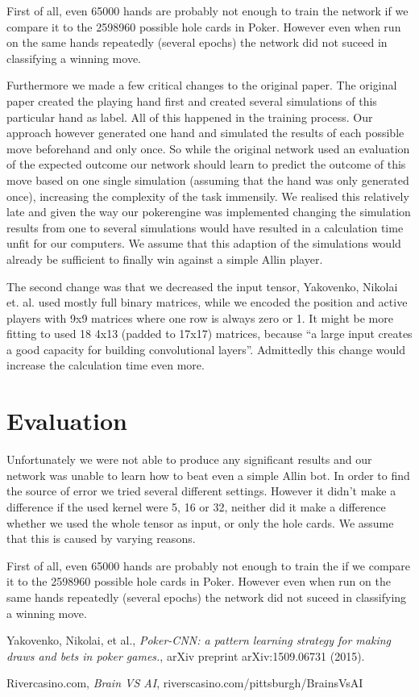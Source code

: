 \documentclass[]{report}
\begin{document}
First of all, even 65000 hands are probably not enough to train the
network if we compare it to the 2598960 possible hole cards in Poker.
However even when run on the same hands repeatedly (several epochs)
the network did not suceed in classifying a winning move. 

Furthermore we made a few critical changes to the original paper.
The original paper created the playing hand first and created several
simulations of this particular hand as label. All of this happened
in the training process. Our approach however generated one hand and
simulated the results of each possible move beforehand and only once.
So while the original network used an evaluation of the expected outcome
our network should learn to predict the outcome of this move based
on one single simulation (assuming that the hand was only generated
once), increasing the complexity of the task immensily. We realised
this relatively late and given the way our pokerengine was implemented
changing the simulation results from one to several simulations would
have resulted in a calculation time unfit for our computers. We assume
that this adaption of the simulations would already be sufficient
to finally win against a simple Allin player.

The second change was that we decreased the input tensor, Yakovenko,
Nikolai et. al. used mostly full binary matrices, while we encoded
the position and active players with 9x9 matrices where one row is
always zero or 1. It might be more fitting to used 18 4x13 (padded
to 17x17) matrices, because ``a large input creates a good capacity
for building convolutional layers''\cite{1}. Admittedly this change
would increase the calculation time even more.

\section{Evaluation \label{see:evaluation} }

Unfortunately we were not able to produce any significant results and our network was unable to learn how to beat even a simple Allin bot. In order to find the source of error we tried several different settings. However it didn't make a difference if the used kernel were 5, 16 or 32, neither did it make a difference whether we used the whole tensor as input, or only the hole cards. We assume that this is caused by varying reasons. 

First of all, even 65000 hands are probably not enough to train the if we compare it to the 2598960 possible hole cards in Poker. However even when run on the same hands repeatedly (several epochs) the network did not suceed in classifying a winning move.

\begin{thebibliography}{}
	 Yakovenko, Nikolai, et al., \emph{Poker-CNN: a pattern learning strategy for making draws and bets in poker games.}, arXiv preprint arXiv:1509.06731 (2015).
	
	 Rivercasino.com, \emph{Brain VS AI},
	riverscasino.com/pittsburgh/BrainsVsAI

\end{thebibliography}  
\end{document}
